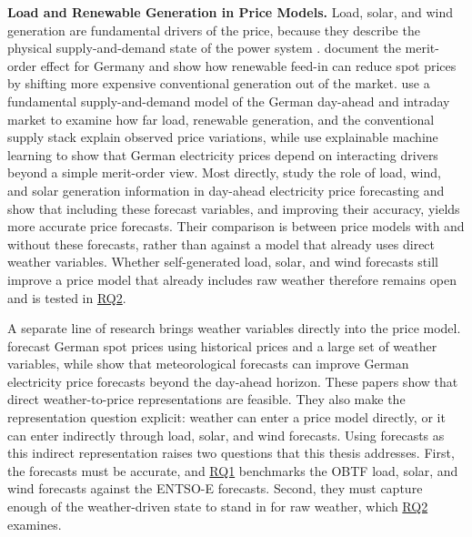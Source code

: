 \noindent\textbf{Load and Renewable Generation in Price Models.}
Load, solar, and wind generation are fundamental drivers of the
price, because they describe the physical supply-and-demand state of the power
system \cite{do2021residualDemand,sensfuss2008meritOrder}.
\textcite{sensfuss2008meritOrder} document the merit-order effect for Germany
and show how renewable feed-in can reduce spot prices by shifting more
expensive conventional generation out of the market. \textcite{pape2016fundamentals}
use a fundamental supply-and-demand model of the German day-ahead and intraday
market to examine how far load, renewable generation, and the conventional
supply stack explain observed price variations, while \textcite{trebbien2023merit} use
explainable machine learning to show that German electricity prices depend on
interacting drivers beyond a simple merit-order view. Most directly,
\textcite{maciejowska2021enhancing} study the role of load, wind, and solar
generation information in day-ahead electricity price forecasting and show that
including these forecast variables, and improving their accuracy, yields more
accurate price forecasts. Their comparison is between price models with and
without these forecasts, rather than against a model that already uses direct
weather variables. Whether self-generated load, solar, and wind forecasts still
improve a price model that already includes raw weather therefore remains open and is tested in \hyperlink{rq:price_impact_generated_forecasts}{RQ2}.

A separate line of research brings weather variables directly into the
price model. \textcite{ludwig2015bigdata} forecast German spot prices using
historical prices and a large set of weather variables, while
\textcite{sgarlato2023weatherPredictions} show that meteorological forecasts
can improve German electricity price forecasts beyond the day-ahead horizon.
These papers show that direct weather-to-price representations are feasible.
They also make the representation question explicit: weather can enter a price
model directly, or it can enter indirectly through load, solar, and wind
forecasts. Using forecasts as this indirect representation raises two questions
that this thesis addresses. First, the forecasts must be accurate, and
\hyperlink{rq:component_forecast_quality}{RQ1} benchmarks the OBTF
load, solar, and wind forecasts against the \mbox{ENTSO-E} forecasts. Second,
they must capture enough of the weather-driven state to stand in for raw
weather, which \hyperlink{rq:price_impact_generated_forecasts}{RQ2} examines.

